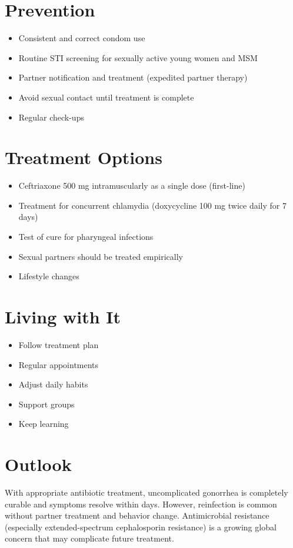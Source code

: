 \section{Prevention}

\begin{itemize}[noitemsep]
  \item Consistent and correct condom use
  \item Routine STI screening for sexually active young women and MSM
  \item Partner notification and treatment (expedited partner therapy)
  \item Avoid sexual contact until treatment is complete
  \item Regular check-ups
\end{itemize}

\section{Treatment Options}

\begin{itemize}[noitemsep]
  \item Ceftriaxone 500 mg intramuscularly as a single dose (first-line)
  \item Treatment for concurrent chlamydia (doxycycline 100 mg twice daily for 7 days)
  \item Test of cure for pharyngeal infections
  \item Sexual partners should be treated empirically
  \item Lifestyle changes
\end{itemize}

\section{Living with It}

\begin{itemize}[noitemsep]
  \item Follow treatment plan
  \item Regular appointments
  \item Adjust daily habits
  \item Support groups
  \item Keep learning
\end{itemize}

\section{Outlook}
With appropriate antibiotic treatment, uncomplicated gonorrhea is completely curable and symptoms resolve within days. However, reinfection is common without partner treatment and behavior change. Antimicrobial resistance (especially extended-spectrum cephalosporin resistance) is a growing global concern that may complicate future treatment.
